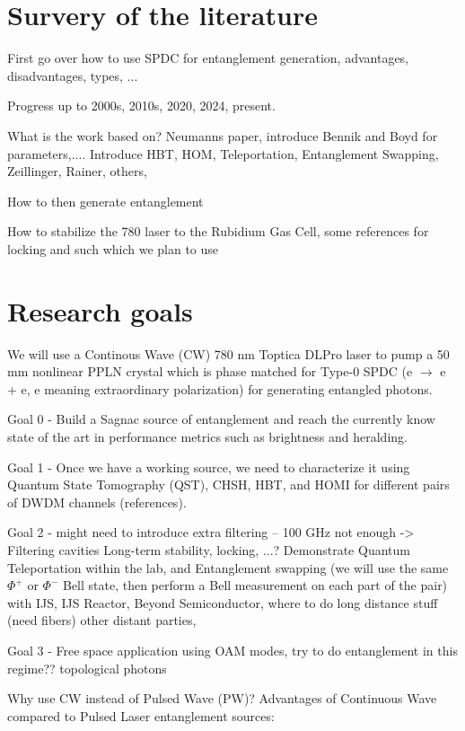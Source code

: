 \documentclass{article}
\theoremstyle{mytheoremstyle}
\theoremstyle{mytheoremstyle}
\theoremstyle{myproblemstyle}
\begin{document}

\section{Survery of the literature}
First go over how to use SPDC for entanglement generation, advantages, disadvantages, types, ...

Progress up to 2000s, 2010s, 2020, 2024, present.

What is the work based on? Neumanns paper, introduce Bennik and Boyd for parameters,.... Introduce HBT, HOM, Teleportation, Entanglement Swapping, Zeillinger, Rainer, others,

How to then generate entanglement

How to stabilize the 780 laser to the Rubidium Gas Cell, some references for locking and such which we plan to use

\section{Research goals}
We will use a Continous Wave (CW) 780 nm Toptica DLPro laser to pump a 50 mm nonlinear PPLN crystal which is phase matched for Type-0 SPDC (e $\rightarrow$ e + e, e meaning extraordinary polarization)
for generating entangled photons.

Goal 0 - Build a Sagnac source of entanglement and reach the currently know state of the art in performance metrics such as brightness and heralding.

Goal 1 - Once we have a working source, we need to characterize it using Quantum State Tomography (QST), CHSH, HBT, and HOMI for different pairs of DWDM channels (references).

Goal 2 - might need to introduce extra filtering -- 100 GHz not enough -> Filtering cavities
Long-term stability, locking, ...? Demonstrate Quantum Teleportation within the lab, and Entanglement swapping (we will use the same $\Phi^+$ or $\Phi^-$ Bell state,
then perform a Bell measurement on each part of the pair) with IJS, IJS Reactor, Beyond Semiconductor, where to do
long distance stuff (need fibers) other distant parties,

Goal 3 - Free space application using OAM modes, try to do entanglement in this regime??
topological photons

Why use CW instead of Pulsed Wave (PW)?
Advantages of Continuous Wave compared to Pulsed Laser entanglement sources:
\end{document}
